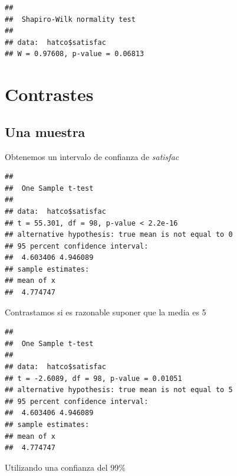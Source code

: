 \documentclass[]{book}
\newenvironment{Shaded}{\begin{snugshade}}{\end{snugshade}}
\newcommand{\KeywordTok}[1]{\textcolor[rgb]{0.13,0.29,0.53}{\textbf{#1}}}
\newcommand{\DataTypeTok}[1]{\textcolor[rgb]{0.13,0.29,0.53}{#1}}
\newcommand{\DecValTok}[1]{\textcolor[rgb]{0.00,0.00,0.81}{#1}}
\newcommand{\CommentTok}[1]{\textcolor[rgb]{0.56,0.35,0.01}{\textit{#1}}}
\newcommand{\OperatorTok}[1]{\textcolor[rgb]{0.81,0.36,0.00}{\textbf{#1}}}
\newcommand{\NormalTok}[1]{#1}
\begin{document}
\begin{verbatim}
## 
##  Shapiro-Wilk normality test
## 
## data:  hatco$satisfac
## W = 0.97608, p-value = 0.06813
\end{verbatim}

\section{Contrastes}\label{contrastes}

\subsection{Una muestra}\label{una-muestra}

Obtenemos un intervalo de confianza de \emph{satisfac}

\begin{Shaded}
\end{Shaded}

\begin{verbatim}
## 
##  One Sample t-test
## 
## data:  hatco$satisfac
## t = 55.301, df = 98, p-value < 2.2e-16
## alternative hypothesis: true mean is not equal to 0
## 95 percent confidence interval:
##  4.603406 4.946089
## sample estimates:
## mean of x 
##  4.774747
\end{verbatim}

Contrastamos si es razonable suponer que la media es 5

\begin{Shaded}
\end{Shaded}

\begin{verbatim}
## 
##  One Sample t-test
## 
## data:  hatco$satisfac
## t = -2.6089, df = 98, p-value = 0.01051
## alternative hypothesis: true mean is not equal to 5
## 95 percent confidence interval:
##  4.603406 4.946089
## sample estimates:
## mean of x 
##  4.774747
\end{verbatim}

Utilizando una confianza del 99\%
\end{document}
